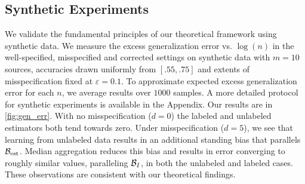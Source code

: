 
\vspace{-0.5em}
\subsection{Synthetic Experiments}
\vspace{-0.5em}
We validate the fundamental principles of our theoretical framework using synthetic data. We measure the excess generalization error vs. $\log(n)$ in the well-specified, misspecified and corrected settings on synthetic data with $m=10$ sources, accuracies drawn uniformly from $[.55, .75]$ and extents of misspecification fixed at $\varepsilon=0.1$. To approximate expected excess generalization error for each $n$, we average results over $1000$ samples. A more detailed protocol for synthetic experiments is available in the Appendix.
Our results are in \autoref{fig:gen_err}. With no misspecification ($d=0$) the labeled and unlabeled estimators both tend towards zero. Under misspecification ($d=5$), we see that learning from unlabeled data results in an additional standing bias that parallels $\mathcal{B}_{\mathrm{est}}$. Median aggregation reduces this bias and results in error converging to roughly similar values, paralleling $\mathcal{B}_I$, in both the unlabeled and labeled cases. These observations are consistent with our theoretical findings.

